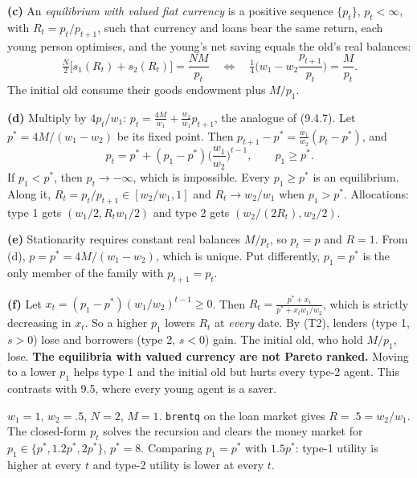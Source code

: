 \documentclass[12pt, letterpaper]{article}
\begin{document}
\begin{tcolorbox}[evenbox,title={Exercise 9.2 \quad Lenders and borrowers in one generation}]
\textbf{(c)} An \emph{equilibrium with valued fiat currency} is a positive sequence $\{p_t\}$,
$p_t<\infty$, with $R_t=p_t/p_{t+1}$, such that currency and loans bear the same return, each young
person optimises, and the young's net saving equals the old's real balances:
\[
\tfrac N2\big[s_1(R_t)+s_2(R_t)\big]=\frac{NM}{p_t}\quad\Longleftrightarrow\quad \tfrac14\Big(w_1-w_2\frac{p_{t+1}}{p_t}\Big)=\frac M{p_t}.
\]
The initial old consume their goods endowment plus $M/p_1$.

\textbf{(d)} Multiply by $4p_t/w_1$: $p_t=\frac{4M}{w_1}+\frac{w_2}{w_1}p_{t+1}$, the analogue of (9.4.7).
Let $p^*=4M/(w_1-w_2)$ be its fixed point. Then $p_{t+1}-p^*=\frac{w_1}{w_2}(p_t-p^*)$, and
\[
\boxed{p_t=p^*+(p_1-p^*)\Big(\frac{w_1}{w_2}\Big)^{t-1},\qquad p_1\ge p^*.}
\]
If $p_1<p^*$, then $p_t\to-\infty$, which is impossible. Every $p_1\ge p^*$ is an equilibrium. Along
it, $R_t=p_t/p_{t+1}\in[w_2/w_1,1]$ and $R_t\to w_2/w_1$ when $p_1>p^*$. Allocations: type 1 gets
$(w_1/2,R_tw_1/2)$ and type 2 gets $(w_2/(2R_t),w_2/2)$.

\textbf{(e)} Stationarity requires constant real balances $M/p_t$, so $p_t=p$ and $R=1$. From (d),
$p=p^*=4M/(w_1-w_2)$, which is unique. Put differently, $p_1=p^*$ is the only member of the family
with $p_{t+1}=p_t$.

\textbf{(f)} Let $x_t=(p_1-p^*)(w_1/w_2)^{t-1}\ge0$. Then
$R_t=\frac{p^*+x_t}{p^*+x_t w_1/w_2}$, which is strictly decreasing in $x_t$. So a higher $p_1$ lowers
$R_t$ at \emph{every} date. By (T2), lenders (type 1, $s>0$) lose and borrowers (type 2, $s<0$) gain.
The initial old, who hold $M/p_1$, lose. \textbf{The equilibria with valued currency are not Pareto
ranked.} Moving to a lower $p_1$ helps type 1 and the initial old but hurts every type-2 agent. This
contrasts with 9.5, where every young agent is a saver.

\begin{tcolorbox}[databox]
$w_1=1$, $w_2=.5$, $N=2$, $M=1$. \texttt{brentq} on the loan market gives $R=.5=w_2/w_1$. The
closed-form $p_t$ solves the recursion and clears the money market for $p_1\in\{p^*,1.2p^*,2p^*\}$,
$p^*=8$. Comparing $p_1=p^*$ with $1.5p^*$: type-1 utility is higher at every $t$ and type-2 utility
is lower at every $t$.
\end{tcolorbox}
\end{tcolorbox}
\end{document}
